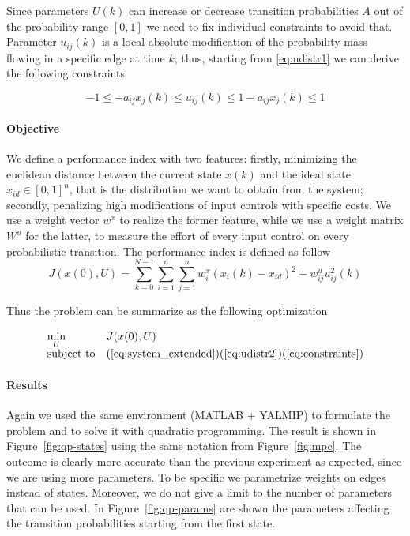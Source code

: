 \documentclass[a4paper, 11pt]{article}
\theoremstyle{definition}
\theoremstyle{remark}
\begin{document}
Since parameters $U(k)$ can increase or decrease transition probabilities $A$ out of the probability range $[0,1]$ we need to fix individual constraints to avoid that. Parameter $u_{ij}(k)$ is a local absolute modification of the probability mass flowing in a specific edge at time $k$, thus, starting from \ref{eq:udistr1} we can derive the following constraints

\begin{equation} \label{eq:constraints}
	-1 \leq -a_{ij}x_j(k) \leq u_{ij}(k) \leq 1-a_{ij}x_{j}(k) \leq 1
\end{equation}

\paragraph{Objective} %
\label{par:objective2}
We define a performance index with two features: firstly, minimizing the euclidean distance between the current state $x(k)$ and the ideal state $x_{id} \in [0,1]^n$, that is the distribution we want to obtain from the system; secondly, penalizing high modifications of input controls with specific costs. We use a weight vector $w^x$ to realize the former feature, while we use a weight matrix $W^u$ for the latter, to measure the effort of every input control on every probabilistic transition. The performance index is defined as follow
\begin{equation} \label{eq:index_ext}
	J(x(0),U) = \sum_{k=0}^{N-1}\sum_{i=1}^{n}\sum_{j=1}^{n} w_i^x(x_i(k) - x_{id})^2 + w_{ij}^u u^2_{ij}(k)
\end{equation}

Thus the problem can be summarize as the following optimization

\begin{equation} \label{eq:opt2}
	\begin{array}{ll}
		\underset{U}{\mbox{min}} & J(x(0),U) \\
		\mbox{subject to} &
		(\ref{eq:system_extended})(\ref{eq:udistr2})(\ref{eq:constraints}) \\
	\end{array}
\end{equation}


\paragraph{Results} %
\label{par:results2}
Again we used the same environment (MATLAB + YALMIP) to formulate the problem and to solve it with quadratic programming. The result is shown in Figure~\ref{fig:qp-states} using the same notation from Figure~\ref{fig:mpc}. The outcome is clearly more accurate than the previous experiment as expected, since we are using more parameters. To be specific we parametrize weights on edges instead of states. Moreover, we do not give a limit to the number of parameters that can be used. In Figure~\ref{fig:qp-params} are shown the parameters affecting the transition probabilities starting from the first state. 
\end{document}
